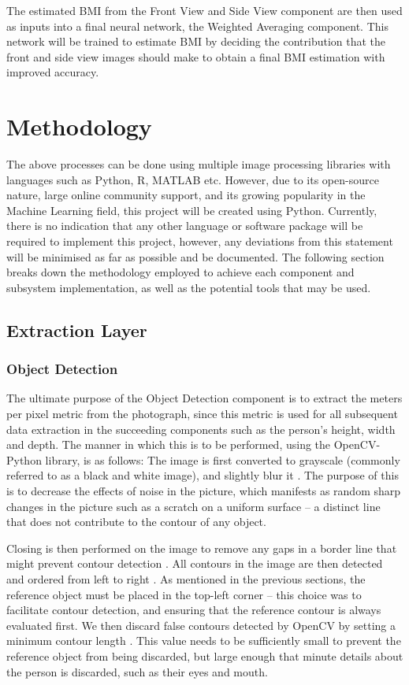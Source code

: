 The estimated BMI from the Front View and Side View component are then used as inputs into a final neural network, the Weighted Averaging component.
This network will be trained to estimate BMI by deciding the contribution that the front and side view images should make to obtain a final BMI estimation with improved accuracy.
\section{Methodology}
The above processes can be done using multiple image processing libraries with languages such as Python, R, MATLAB etc.
However, due to its open-source nature, large online community support, and its growing popularity in the Machine Learning field, this project will be created using Python.
Currently, there is no indication that any other language or software package will be required to implement this project, however, any deviations from this statement will be minimised as far as possible and be documented.
The following section breaks down the methodology employed to achieve each component and subsystem implementation, as well as the potential tools that may be used.
\subsection{Extraction Layer}
\subsubsection{Object Detection}
The ultimate purpose of the Object Detection component is to extract the meters per pixel metric from the photograph, since this metric is used for all subsequent data extraction in the succeeding components such as the person's height, width and depth.
The manner in which this is to be performed, using the OpenCV-Python library, is as follows: The image is first converted to grayscale (commonly referred to as a black and white image), and slightly blur it \cite{objectDetection}.
The purpose of this is to decrease the effects of noise in the picture, which manifests as random sharp changes in the picture such as a scratch on a uniform surface -- a distinct line that does not contribute to the contour of any object.

Closing is then performed on the image to remove any gaps in a border line that might prevent contour detection \cite{objectDetection}.
All contours in the image are then detected and ordered from left to right \cite{objectDetection}.
As mentioned in the previous sections, the reference object must be placed in the top-left corner -- this choice was to facilitate contour detection, and ensuring that the reference contour is always evaluated first.
We then discard false contours detected by OpenCV by setting a minimum contour length \cite{objectDetection}.
This value needs to be sufficiently small to prevent the reference object from being discarded, but large enough that minute details about the person is discarded, such as their eyes and mouth.

